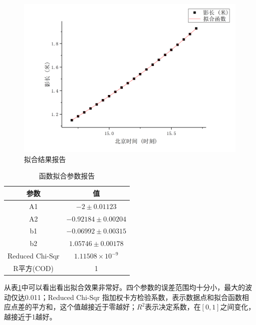 \documentclass[12pt]{cumcmart}   %
\begin{document}
 \begin{figure}[h]
	\centering
	\includegraphics[scale=0.4]{images/niheyi.png}
	\caption{拟合结果报告}
	\label{nihe1}
\end{figure}  
\begin{table}[!htbp]
	\centering
	\caption{函数拟合参数报告}\label{baogao1}
	\begin{tabular}{cc}
		\toprule[1.5pt]
		参数& 值 \\
		\midrule[1pt]
	A1	&$-2\pm  0.01123$\\
	A2	&$-0.92184 \pm  0.00204$\\
	b1	&$-0.06992 \pm 0.00315$\\
	b2  &$	1.05746\pm  0.00178$\\
	Reduced Chi-Sqr &$	1.11508\times 10^{-9}$\\
	R平方(COD)&	1\\
		\bottomrule[1.5pt]
	\end{tabular}
\end{table}
从表\ref{baogao1}中可以看出看出拟合效果非常好。四个参数的误差范围均十分小，最大的波动仅达0.011；Reduced Chi-Sqr 指加权卡方检验系数，表示数据点和拟合函数相应点差的平方和，这个值越接近于零越好；$R^2$表示决定系数，在$[0,1]$之间变化，越接近于1越好。
\end{document}
